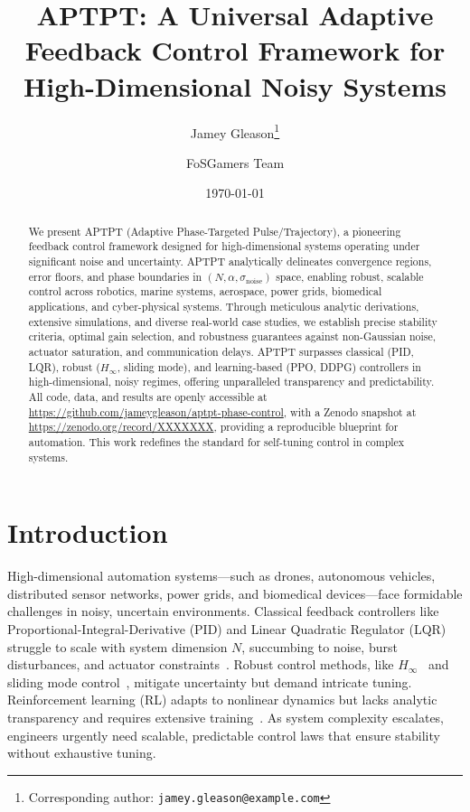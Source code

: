 \documentclass[12pt]{article}
\title{APTPT: A Universal Adaptive Feedback Control Framework for High-Dimensional Noisy Systems}
\author{Jamey Gleason\thanks{Corresponding author: \texttt{jamey.gleason@example.com}} \and FoSGamers Team}
\date{\today}
\begin{document}
\maketitle

\begin{abstract}
We present APTPT (Adaptive Phase-Targeted Pulse/Trajectory), a pioneering feedback control framework designed for high-dimensional systems operating under significant noise and uncertainty. APTPT analytically delineates convergence regions, error floors, and phase boundaries in $(N, \alpha, \sigma_{\text{noise}})$ space, enabling robust, scalable control across robotics, marine systems, aerospace, power grids, biomedical applications, and cyber-physical systems. Through meticulous analytic derivations, extensive simulations, and diverse real-world case studies, we establish precise stability criteria, optimal gain selection, and robustness guarantees against non-Gaussian noise, actuator saturation, and communication delays. APTPT surpasses classical (PID, LQR), robust ($H_\infty$, sliding mode), and learning-based (PPO, DDPG) controllers in high-dimensional, noisy regimes, offering unparalleled transparency and predictability. All code, data, and results are openly accessible at \url{https://github.com/jameygleason/aptpt-phase-control}, with a Zenodo snapshot at \url{https://zenodo.org/record/XXXXXXX}, providing a reproducible blueprint for automation. This work redefines the standard for self-tuning control in complex systems.
\end{abstract}

\section{Introduction}
High-dimensional automation systems—such as drones, autonomous vehicles, distributed sensor networks, power grids, and biomedical devices—face formidable challenges in noisy, uncertain environments. Classical feedback controllers like Proportional-Integral-Derivative (PID) and Linear Quadratic Regulator (LQR) struggle to scale with system dimension $N$, succumbing to noise, burst disturbances, and actuator constraints~\citep{AstromMurray2008}. Robust control methods, like $H_\infty$~\citep{ZhouDoyle1998} and sliding mode control~\citep{EdwardsSpurgeon1998}, mitigate uncertainty but demand intricate tuning. Reinforcement learning (RL) adapts to nonlinear dynamics but lacks analytic transparency and requires extensive training~\citep{SuttonBarto2018}. As system complexity escalates, engineers urgently need scalable, predictable control laws that ensure stability without exhaustive tuning.
\end{document}
